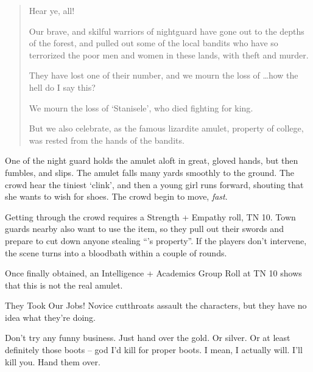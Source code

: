 \begin{multicols}{2}
\begin{boxtext}
	\begin{quotation}
		Hear ye, all!

		Our brave, and skilful warriors of \gls{nightguard} have gone out to the depths of the forest, and pulled out some of the local bandits who have so terrorized the poor men and women in these lands, with theft and murder.

		They have lost one of their number, and we mourn the loss of \ldots how the hell do I say this?

		We mourn the loss of `Stanisele', who died fighting for \gls{king}.

		But we also celebrate, as the famous lizardite amulet, property of \gls{college}, was rested from the hands of the bandits.

	\end{quotation}

	One of the night guard holds the amulet aloft in great, gloved hands, but then fumbles, and slips.  The amulet falls many yards smoothly to the ground.  The crowd hear the tiniest `clink', and then a young girl runs forward, shouting that she wants to wish for shoes.  The crowd begin to move, \emph{fast}.

\end{boxtext}

Getting through the crowd requires a Strength + Empathy roll, TN 10.
Town guards nearby also want to use the item, so they pull out their swords and prepare to cut down anyone stealing ``'s property''.
If the players don't intervene, the scene turns into a bloodbath within a couple of rounds.

Once finally obtained, an Intelligence + Academics Group Roll at TN 10 shows that this is not the real amulet.%
\iftoggle{core}%
{\footnote{See the core rules, page \pageref{grouproll}, for Group Rolls.}}%
{}%

{They Took Our Jobs!}%
{Novice cutthroats assault the characters, but they have no idea what they're doing.}%

\begin{speechtext}

	Don't try any funny business.  Just hand over the gold. Or silver.  Or at least definitely those boots -- god I'd kill for proper boots.  I mean, I actually will.  I'll kill you.  Hand them over.

\end{speechtext}


\end{multicols}
